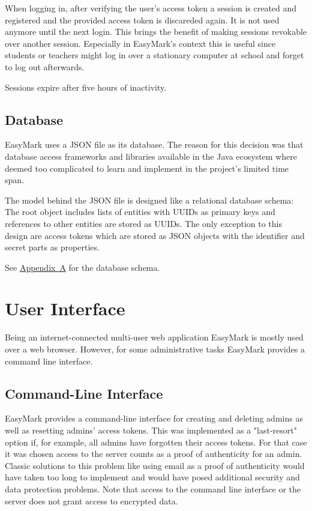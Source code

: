 \documentclass[12pt,a4paper,oneside]{report}
\newcommand{\RefAppendix}[1]{\hyperref[app:#1]{Appendix~#1}}
\begin{document}
	When logging in, after verifying the user's access token a session is created and registered and the provided access token is discareded again. It is not used anymore until the next login. This brings the benefit of making sessions revokable over another session. Especially in EasyMark's context this is useful since students or teachers might log in over a stationary computer at school and forget to log out afterwards.

	Sessions expire after five hours of inactivity.

	\subsection{Database}
	EasyMark uses a JSON file as its database. The reason for this decision was that database access frameworks and libraries available in the Java ecosystem where deemed too complicated to learn and implement in the project's limited time span.

	The model behind the JSON file is designed like a relational database schema: The root object includes lists of entities with UUIDs as primary keys and references to other entities are stored as UUIDs. The only exception to this design are access tokens which are stored as JSON objects with the identifier and secret parts as properties.

	See \RefAppendix{A} for the database schema.

	\section{User Interface}
	Being an internet-connected multi-user web application EasyMark is mostly used over a web browser. However, for some administrative tasks EasyMark provides a command line interface.

	\subsection{Command-Line Interface}
	EasyMark provides a command-line interface for creating and deleting admins as well as resetting admins' access tokens. This was implemented as a "last-resort" option if, for example, all admins have forgotten their access tokens. For that case it was chosen access to the server counts as a proof of authenticity for an admin. Classic solutions to this problem like using email as a proof of authenticity would have taken too long to implement and would have posed additional security and data protection problems. Note that access to the command line interface or the server does not grant access to encrypted data.
\end{document}
